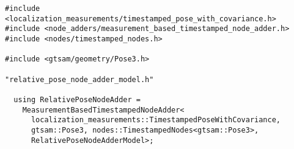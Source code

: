 \begin{verbatim}
#include <localization_measurements/timestamped_pose_with_covariance.h>
#include <node_adders/measurement_based_timestamped_node_adder.h>
#include <nodes/timestamped_nodes.h>

#include <gtsam/geometry/Pose3.h>

"relative_pose_node_adder_model.h"

  using RelativePoseNodeAdder =
    MeasurementBasedTimestampedNodeAdder<
      localization_measurements::TimestampedPoseWithCovariance,
      gtsam::Pose3, nodes::TimestampedNodes<gtsam::Pose3>,
      RelativePoseNodeAdderModel>;
\end{verbatim}